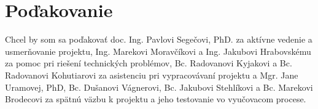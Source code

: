 \chapter*{Poďakovanie}
\thispagestyle{empty}

Chcel by som sa poďakovať doc. Ing. Pavlovi Segečovi, PhD. za aktívne vedenie a usmerňovanie projektu, Ing. Marekovi Moravčíkovi a Ing. Jakubovi Hrabovskému za pomoc pri riešení technických problémov, Bc. Radovanovi Kyjakovi a Bc. Radovanovi Kohutiarovi za asistenciu pri vypracovávaní projektu a Mgr. Jane Uramovej, PhD, Bc. Dušanovi Vágnerovi, Bc. Jakubovi Stehlíkovi a Bc. Marekovi Brodecovi za spätnú väzbu k projektu a jeho testovanie vo vyučovacom procese.